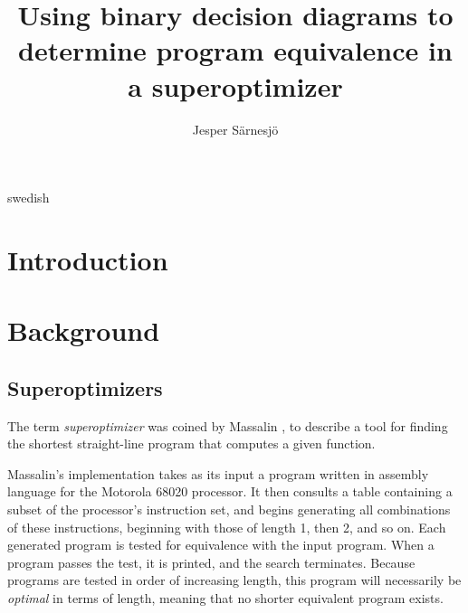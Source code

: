\documentclass[a4paper,11pt]{kth-mag}
\title{Using binary decision diagrams to determine program equivalence in a superoptimizer}
\subtitle{}
\author{Jesper Särnesjö}
\date{}
\begin{document}
\frontmatter

\pagestyle{empty}

\removepagenumbers

\maketitle


\begin{abstract}
\end{abstract}

\clearpage

\begin{foreignabstract}{swedish}
\end{foreignabstract}

\clearpage

\tableofcontents*

\mainmatter

\pagestyle{newchap}

\chapter{Introduction}

\chapter{Background}

\section{Superoptimizers}

The term \emph{superoptimizer} was coined by Massalin \cite{massalin87}, to describe a tool for finding the shortest straight-line program that computes a given function.

Massalin's implementation takes as its input a program written in assembly language for the Motorola 68020 processor.
It then consults a table containing a subset of the processor's instruction set, and begins generating all combinations of these instructions, beginning with those of length 1, then 2, and so on.
Each generated program is tested for equivalence with the input program.
When a program passes the test, it is printed, and the search terminates.
Because programs are tested in order of increasing length, this program will necessarily be \emph{optimal} in terms of length, meaning that no shorter equivalent program exists.
\end{document}
